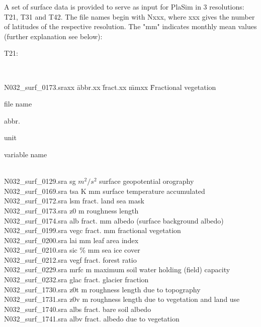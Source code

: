 
A set of surface data is provided to serve as input for PlaSim in 3 resolutions: T21, T31 and T42. 
The file names begin with Nxxx, where xxx gives the number of latitudes of the respective resolution. 
The "mm" indicates monthly mean values (further explanation see below):\\[3.ex]
\begin{bf}T21:\end{bf}\\
\vspace{-3.8ex}
\begin{tabbing}
N032\_surf\_0173.sraxx \= abbr.xx   \= fract.xx  \= mmxx  \= Fractional vegetation \kill
\begin{bf}file name\end{bf}        \> \begin{bf}abbr.\end{bf}\>\begin{bf}unit\end{bf} \>      \> \begin{bf}variable name\end{bf}\\[0.8ex]
N032\_surf\_0129.sra \> sg   \> $m^{2}/s^{2}$ \>      \> surface geopotential orography \\
N032\_surf\_0169.sra \> tsa  \> K             \> mm   \> surface temperature accumulated \\
N032\_surf\_0172.sra \> lsm  \> fract.        \>      \> land sea mask \\
N032\_surf\_0173.sra \> z0   \> m             \>      \> roughness length \\
N032\_surf\_0174.sra \> alb  \> fract.        \> mm   \> albedo (surface background albedo) \\
N032\_surf\_0199.sra \> vegc \> fract.        \> mm   \> fractional vegetation \\
N032\_surf\_0200.sra \> lai  \>               \> mm   \> leaf area index \\
N032\_surf\_0210.sra \> sic  \> \%            \> mm   \> sea ice cover \\
N032\_surf\_0212.sra \> vegf \> fract.        \>      \> forest ratio \\
N032\_surf\_0229.sra \> mrfc \> m             \>      \> maximum soil water holding (field) capacity \\
N032\_surf\_0232.sra \> glac \> fract.        \>      \> glacier fraction  \\
N032\_surf\_1730.sra \> z0t  \> m             \>      \> roughness length due to topography \\
N032\_surf\_1731.sra \> z0v  \> m             \>      \> roughness length due to vegetation and land use\\
N032\_surf\_1740.sra \> albs \> fract.        \>      \> bare soil albedo \\
N032\_surf\_1741.sra \> albv \> fract.        \>      \> albedo due to vegetation \\
\end{tabbing}

